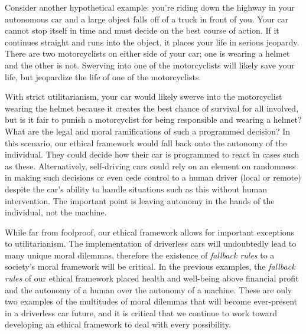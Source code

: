 Consider another hypothetical example: you're riding down the highway in your 
autonomous car and a large object falls off of a truck in front of you. 
Your car cannot stop itself in time and must decide on the best course 
of action. If it continues straight and runs into the object, it places 
your life in serious jeopardy. There are two motorcyclists on either 
side of your car; one is wearing a helmet and the other is not. Swerving 
into one of the motorcyclists will likely save your life, but jeopardize 
the life of one of the motorcyclists.

With strict utilitarianism, your car would likely swerve into the 
motorcyclist wearing the helmet because it creates the best chance of 
survival for all involved, but is it fair to punish a motorcyclist for being 
responsible and wearing a helmet? What are the legal and moral ramifications 
of such a programmed decision? In this scenario, our ethical 
framework would fall back onto the autonomy of the individual.
They could decide how their car is programmed to react in cases such as these.
Alternatively, self-driving cars could rely on an element on randomness
in making such decisions or even cede control to a human driver (local
or remote) despite the car's ability to handle situations such as this without
human intervention. The important point is leaving autonomy in the hands of
the individual, not the machine. 

While far from foolproof, our ethical framework allows for important 
exceptions to utilitarianism. The implementation of 
driverless cars will undoubtedly lead to many unique moral dilemmas, 
therefore the existence of \textit{fallback rules} to a society's moral framework
will be critical. In the previous examples, the \textit{fallback rules} of our ethical framework placed 
health and well-being above financial profit and the autonomy of 
a human over the autonomy of a machine. These are only two examples of 
the multitudes of moral dilemmas that will become ever-present in a driverless
car future, and it is critical that we continue to work toward developing an
ethical framework to deal with every possibility. 

